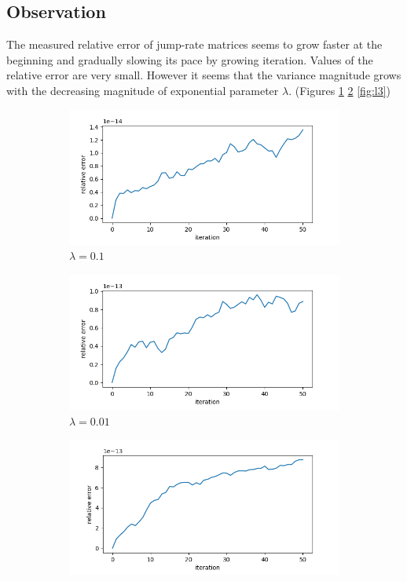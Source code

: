 \documentclass[thesis=M,english]{FITthesis}[2012/10/20]
\begin{document}
\subsection*{ Observation }

The measured relative error of jump-rate matrices seems to grow faster at the beginning and gradually slowing its pace by growing iteration. Values of the relative error are very small. However it seems that the variance magnitude grows with the decreasing magnitude of exponential parameter $\lambda$. (Figures \ref{fig:l1} \ref{fig:l2} \ref{fig:l3})  


\begin{figure}
\centering
\begin{subfigure}{.7\textwidth}
  \centering
  \includegraphics[width=1\linewidth]{img/ex3/0_1.png}
  \caption{ $\lambda = 0.1$ }
  \label{fig:l1}
\end{subfigure}
\begin{subfigure}{.7\textwidth}
  \centering
  \includegraphics[width=1\linewidth]{img/ex3/00_1.png}
  \caption{$\lambda = 0.01$}
  \label{fig:l2}
\end{subfigure}
\begin{subfigure}{.7\textwidth}
  \centering
  \includegraphics[width=1\linewidth]{img/ex3/000_1.png}

\end{subfigure}
\end{figure}
\end{document}
